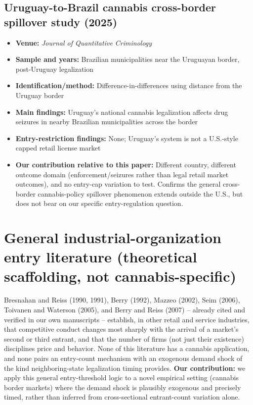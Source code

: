 \documentclass[11pt]{article}
\begin{document}
\subsection{Uruguay-to-Brazil cannabis cross-border spillover study (2025)}
\begin{itemize}
\item \textbf{Venue:} \emph{Journal of Quantitative Criminology}
\item \textbf{Sample and years:} Brazilian municipalities near the Uruguayan border, post-Uruguay
legalization
\item \textbf{Identification/method:} Difference-in-differences using distance from the Uruguay border
\item \textbf{Main findings:} Uruguay's national cannabis legalization affects drug seizures in nearby
Brazilian municipalities across the border
\item \textbf{Entry-restriction findings:} None; Uruguay's system is not a U.S.-style capped retail license
market
\item \textbf{Our contribution relative to this paper:} Different country, different outcome domain
(enforcement/seizures rather than legal retail market outcomes), and no entry-cap variation to test. Confirms
the general cross-border cannabis-policy spillover phenomenon extends outside the U.S., but does not bear on
our specific entry-regulation question.
\end{itemize}

\section{General industrial-organization entry literature (theoretical scaffolding, not cannabis-specific)}
Bresnahan and Reiss (1990, 1991), Berry (1992), Mazzeo (2002), Seim (2006), Toivanen and Waterson (2005), and
Berry and Reiss (2007) -- already cited and verified in our own manuscripts -- establish, in other retail and
service industries, that competitive conduct changes most sharply with the arrival of a market's second or
third entrant, and that the number of firms (not just their existence) disciplines price and behavior. None of
this literature has a cannabis application, and none pairs an entry-count mechanism with an exogenous demand
shock of the kind neighboring-state legalization timing provides. \textbf{Our contribution:} we apply this
general entry-threshold logic to a novel empirical setting (cannabis border markets) where the demand shock is
plausibly exogenous and precisely timed, rather than inferred from cross-sectional entrant-count variation
alone.
\end{document}
